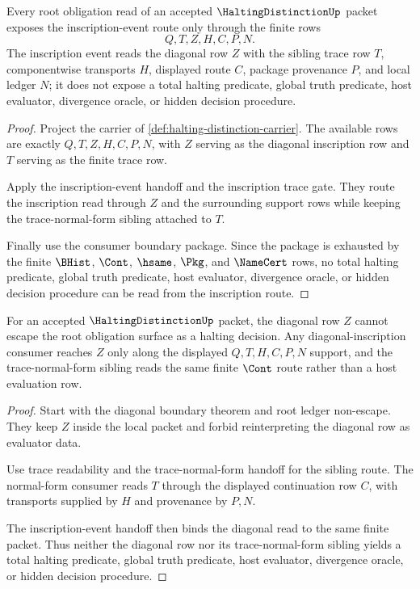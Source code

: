 \begin{theorem}
\label{thm:halting-distinction-root-inscription-trace-totality}
Every root obligation read of an accepted $\HaltingDistinctionUp$ packet exposes the inscription-event route only through the finite rows
$$
Q,T,Z,H,C,P,N.
$$
The inscription event reads the diagonal row $Z$ with the sibling trace row $T$, componentwise transports $H$, displayed route $C$, package provenance $P$, and local ledger $N$; it does not expose a total halting predicate, global truth predicate, host evaluator, divergence oracle, or hidden decision procedure.
\end{theorem}
\begin{proof}
Project the carrier of \autoref{def:halting-distinction-carrier}. The available rows are exactly $Q,T,Z,H,C,P,N$, with $Z$ serving as the diagonal inscription row and $T$ serving as the finite trace row.

Apply the inscription-event handoff and the inscription trace gate. They route the inscription read through $Z$ and the surrounding support rows while keeping the trace-normal-form sibling attached to $T$.

Finally use the consumer boundary package. Since the package is exhausted by the finite $\BHist$, $\Cont$, $\hsame$, $\Pkg$, and $\NameCert$ rows, no total halting predicate, global truth predicate, host evaluator, divergence oracle, or hidden decision procedure can be read from the inscription route.
\end{proof}

\begin{theorem}
\label{thm:halting-distinction-root-diagonal-inscription-nonescape}
For an accepted $\HaltingDistinctionUp$ packet, the diagonal row $Z$ cannot escape the root obligation surface as a halting decision. Any diagonal-inscription consumer reaches $Z$ only along the displayed $Q,T,H,C,P,N$ support, and the trace-normal-form sibling reads the same finite $\Cont$ route rather than a host evaluation row.
\end{theorem}
\begin{proof}
Start with the diagonal boundary theorem and root ledger non-escape. They keep $Z$ inside the local packet and forbid reinterpreting the diagonal row as evaluator data.

Use trace readability and the trace-normal-form handoff for the sibling route. The normal-form consumer reads $T$ through the displayed continuation row $C$, with transports supplied by $H$ and provenance by $P,N$.

The inscription-event handoff then binds the diagonal read to the same finite packet. Thus neither the diagonal row nor its trace-normal-form sibling yields a total halting predicate, global truth predicate, host evaluator, divergence oracle, or hidden decision procedure.
\end{proof}

